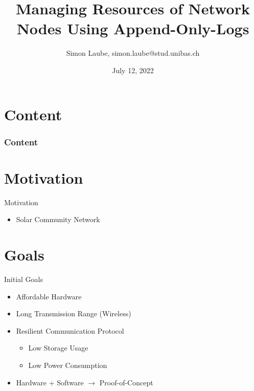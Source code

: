 \documentclass[aspectratio=169]{beamer}
\title              {Managing Resources of Network Nodes Using Append-Only-Logs}
\author             {Simon Laube, simon.laube@stud.unibas.ch}
\institute          {Advisor: Prof. Dr. Christian Tschudin, 
                    Supervisor: Fabrizio Parrillo}
\date               {July 12, 2022}
\begin{document}

\begin{frame}[t,plain]
\titlepage
\end{frame}


\section*{Content}	

\begin{frame}
\frametitle{Content} 
\tableofcontents
\end{frame}


\section{Motivation}

\begin{frame}[c]{Motivation}
\begin{itemize}
    \item Solar Community Network
\end{itemize}        
\end{frame}

\section{Goals}

\begin{frame}[c]{Initial Goals}
\begin{itemize}
    \item Affordable Hardware
    \item Long Transmission Range (Wireless)
    \item Resilient Communication Protocol
    \begin{itemize}
    	\item Low Storage Usage
	\item Low Power Consumption
    \end{itemize}
    \item Hardware + Software $\rightarrow$ Proof-of-Concept
    
\end{itemize}        
\end{frame}
\end{document}
